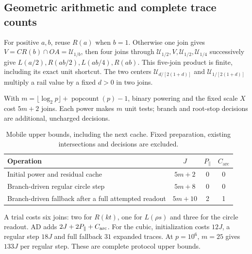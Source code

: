 \documentclass[11pt,a4paper]{article}
\newcommand{\hub}[1]{\mathcal U_{#1}}
\begin{document}
\subsection{Geometric arithmetic and complete trace counts}
For positive $a,b$, reuse $R(a)$ when $b=1$. Otherwise one join gives $V=CR(b)\cap OA=\hub{1/b}$, then four joins through $\hub{1/2},V,\hub{1/2},\hub{1/4}$ successively give $L(a/2),R(ab/2),L(ab/4),R(ab)$. This five-join product is finite, including its exact unit shortcut. The two centers $\hub{d/[2(1+d)]}$ and $\hub{1/[2(1+d)]}$ multiply a rail value by a fixed $d>0$ in two joins.

With $m=\lfloor\log_2p\rfloor+\operatorname{popcount}(p)-1$, binary powering and the fixed scale $X$ cost $5m+2$ joins. Each power makes $m$ unit tests; branch and root-stop decisions are additional, uncharged decisions.

\begin{table}[H]\centering\small
\caption{Mobile upper bounds, including the next cache. Fixed preparation, existing intersections and decisions are excluded.}
\begin{tabularx}{\linewidth}{@{}Xccc@{}}\toprule
Operation & $J$ & $P_{\parallel}$ & $C_{\mathrm{arc}}$\\\midrule
Initial power and residual cache & $5m+2$ & 0 & 0\\
Branch-driven regular circle step & $5m+8$ & 0 & 0\\
Branch-driven fallback after a full attempted readout & $5m+10$ & 2 & 1\\
\bottomrule
\end{tabularx}
\end{table}
A trial costs six joins: two for $R(kt)$, one for $L(\rho s)$ and three for the circle readout. AD adds $2J+2P_{\parallel}+C_{\rm arc}$. For the cubic, initialization costs $12J$, a regular step $18J$ and full fallback $31$ expanded traces. At $p=10^6$, $m=25$ gives $133J$ per regular step. These are complete protocol upper bounds.

\clearpage
\end{document}
